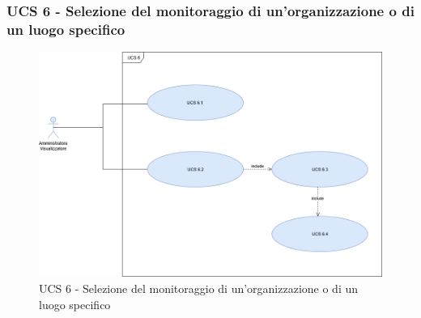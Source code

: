 \newpage

\subsubsection{UCS 6 - Selezione del monitoraggio di un'organizzazione o di un luogo specifico}

\begin{figure}[h]
\centering
\includegraphics[scale=0.3]{sezioni/UseCase/Immagini/UCS6.png}
\caption{UCS 6 - Selezione del monitoraggio di un'organizzazione o di un luogo specifico}
\end{figure}

